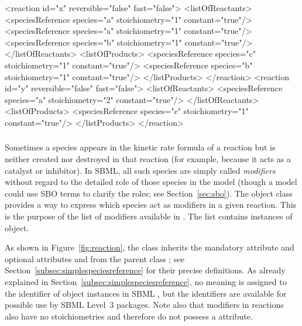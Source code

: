 \begin{example}
<reaction id="x" reversible="false" fast="false">
    <listOfReactants>
        <speciesReference species="a" stoichiometry="1" constant="true"/>
        <speciesReference species="a" stoichiometry="1" constant="true"/>
        <speciesReference species="b" stoichiometry="1" constant="true"/>
    </listOfReactants>
    <listOfProducts>
        <speciesReference species="c" stoichiometry="1" constant="true"/>
        <speciesReference species="b" stoichiometry="1" constant="true"/>
    </listProducts>
</reaction>
<reaction id="y" reversible="false" fast="false">
    <listOfReactants>
        <speciesReference species="a" stoichiometry="2" constant="true"/>
    </listOfReactants>
    <listOfProducts>
        <speciesReference species="c" stoichiometry="1" constant="true"/>
    </listProducts>
</reaction>
\end{example}



\subsubsection{}
\label{subsec:modifierreference}

Sometimes a species appears in the kinetic rate formula of a
reaction but is neither created nor destroyed in that reaction
(for example, because it acts as a catalyst or inhibitor).  In
SBML, all such species are simply called \emph{modifiers} without
regard to the detailed role of those species in the model (though
a model could use SBO terms to clarify the roles; see
Section~\ref{sec:sbo}).  The \Reaction object class provides a way
to express which species act as modifiers in a given reaction.
This is the purpose of the list of modifiers available in
\Reaction.  The list contains instances of
\ModifierSpeciesReference object.

As shown in Figure~\vref{fig:reaction}, the
\ModifierSpeciesReference class inherits the mandatory attribute
 and optional attributes  and
 from the parent class \SimpleSpeciesReference; see
Section~\ref{subsec:simplespeciesreference} for their precise
definitions.  As already explained in
Section~\ref{subsec:simplespeciesreference}, no meaning is
assigned to the identifier of \ModifierSpeciesReference object
instances in SBML \thisLV, but the identifiers are available for
possible use by SBML Level~3 packages.  Note also that modifiers
in reactions also have no stoichiometries and therefore do not
possess a  attribute.

